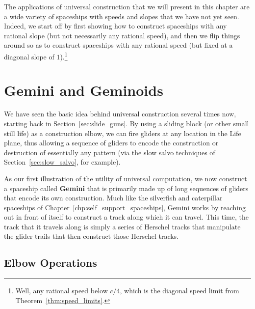The applications of universal construction that we will present in this chapter are a wide variety of spaceships with speeds and slopes that we have not yet seen. Indeed, we start off by first showing how to construct spaceships with any rational slope (but not necessarily any rational speed), and then we flip things around so as to construct spaceships with any rational speed (but fixed at a diagonal slope of $1$).\footnote{Well, any rational speed below $c/4$, which is the diagonal speed limit from Theorem~\ref{thm:speed_limits}.}


\section{Gemini and Geminoids}\label{sec:gemini}

We have seen the basic idea behind universal construction several times now, starting back in Section~\ref{sec:slide_guns}. By using a sliding block (or other small still life) as a construction elbow, we can fire gliders at any location in the Life plane, thus allowing a sequence of gliders to encode the construction or destruction of essentially any pattern (via the slow salvo techniques of Section~\ref{sec:slow_salvo}, for example).

As our first illustration of the utility of universal computation, we now construct a spaceship called \textbf{Gemini} that is primarily made up of long sequences of gliders that encode its own construction. Much like the silverfish and caterpillar spaceships of Chapter~\ref{chp:self_support_spaceships}, Gemini works by reaching out in front of itself to construct a track along which it can travel. This time, the track that it travels along is simply a series of Herschel tracks that manipulate the glider trails that then construct those Herschel tracks.


\subsection{Elbow Operations}\label{sec:gemini_elbow}

